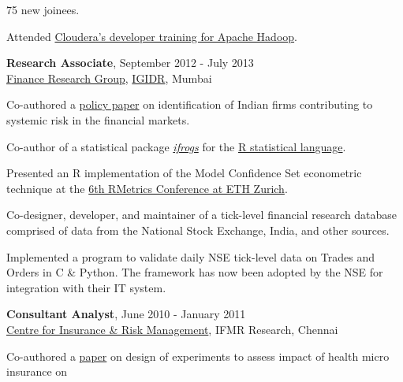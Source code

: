 \documentclass[a4paper,10pt]{article}
\renewenvironment{itemize}{
\begin{list}{}{
  \setlength{\leftmargin}{1.5em}
  }
  }{
\end{list}
}
\begin{document}
{\begin{itemize}
\begin{itemize}
        75 new joinees.
      \item Attended \href{http://university.cloudera.com/course/developer}
        {Cloudera's developer training for Apache Hadoop}.
    \end{itemize}
    \vspace*{\baselineskip} %
  \item \textbf{Research Associate}, September 2012 - July 2013 \\
    \href{http://ifrogs.org}{Finance Research Group},
    \href{http://www.igidr.ac.in}{IGIDR}, Mumbai
    \begin{itemize}
      \item Co-authored a
        \href{http://ifrogs.org/releases/Thomasetal2013_systemicRisk.html}{policy
        paper} on identification of Indian firms contributing to systemic risk
        in the financial markets.
      \item Co-author of a statistical package
        \href{https://r-forge.r-project.org/projects/ifrogs/}{\emph{ifrogs}}
        for the \href{http://www.r-project.org}{R statistical language}.
      \item Presented an R implementation of the Model Confidence Set
        econometric technique at the
        \href{https://www.rmetrics.org/meielisalp2012}{6th RMetrics Conference
        at ETH Zurich}.
      \item Co-designer, developer, and maintainer of a tick-level
        financial research database comprised of data from the National
        Stock Exchange, India, and other sources.
      \item Implemented a program to validate daily NSE tick-level data on
        Trades and Orders in C \& Python. The framework has now been adopted by
        the NSE for integration with their IT system.
    \end{itemize}
    \vspace*{\baselineskip} %
    \newpage
  \item \textbf{Consultant Analyst}, June 2010 - January 2011 \\
    \href{http://www.cirm.in/} {Centre for Insurance \& Risk Management},
    IFMR Research, Chennai
    \begin{itemize}
      \item Co-authored a
        \href{http://www.munichre-foundation.org/dms/MRS/Documents/Microinsurance/2010_IMC/S11_MIC2010_Presentation_Behl.pdf}{paper}
        on design of experiments to assess impact of health micro insurance on

\end{itemize}
\end{itemize}}
\end{document}

